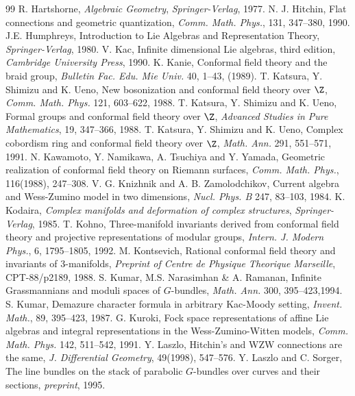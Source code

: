 \begin{thebibliography}{99}
 R. Hartshorne, \emph{Algebraic Geometry}, \emph{Springer-Verlag}, 1977.
 N. J. Hitchin, Flat connections and geometric quantization, \emph{Comm. Math. Phys.}, 131, 347--380, 1990.
 J.E. Humphreys, Introduction to Lie Algebras and Representation Theory, \emph{Springer-Verlag}, 1980.
 V. Kac, Infinite dimensional Lie algebras, third edition, \emph{Cambridge University Press}, 1990.
 K. Kanie, Conformal field theory and the braid group, \emph{Bulletin Fac. Edu. Mie Univ.} 40, 1--43, (1989).
 T. Katsura, Y. Shimizu and K. Ueno, New bosonization and conformal field theory over $\Z$, \emph{Comm. Math. Phys.} 121, 603--622, 1988.
 T. Katsura, Y. Shimizu and K. Ueno, Formal groups and conformal field theory over $\Z$, \emph{Advanced Studies in Pure Mathematics}, 19, 347--366, 1988.
 T. Katsura, Y. Shimizu and K. Ueno, Complex cobordism ring and conformal field theory over $\Z$, \emph{Math. Ann.} 291, 551--571, 1991.
 N. Kawamoto, Y. Namikawa, A. Tsuchiya and Y. Yamada, Geometric realization of conformal field theory on Riemann surfaces, \emph{Comm. Math. Phys.}, 116(1988), 247--308.
 V. G. Knizhnik and A. B. Zamolodchikov, Current algebra and Wess-Zumino model in two dimensions, \emph{Nucl. Phys. B} 247, 83--103, 1984.
 K. Kodaira, \emph{Complex manifolds and deformation of complex structures}, \emph{Springer-Verlag}, 1985.
 T. Kohno, Three-manifold invariants derived from conformal field theory and projective representations of modular groups, \emph{Intern. J. Modern Phys.}, 6, 1795--1805, 1992.
 M. Kontsevich, Rational conformal field theory and invariants of 3-manifolds, \emph{Preprint of Centre de Physique Theorique Marseille}, CPT-88/p2189, 1988.
 S. Kumar, M.S. Narasimhan \& A. Ramanan, Infinite Grassmannians and moduli spaces of $G$-bundles, \emph{Math. Ann.} 300, 395--423,1994.
 S. Kumar, Demazure character formula in arbitrary Kac-Moody setting, \emph{Invent. Math.}, 89, 395--423, 1987.
 G. Kuroki, Fock space representations of affine Lie algebras and integral representations in the Wess-Zumino-Witten models, \emph{Comm. Math. Phys.} 142, 511--542, 1991.
 Y. Laszlo, Hitchin's and WZW connections are the same, \emph{J. Differential Geometry}, 49(1998), 547--576.
 Y. Laszlo and C. Sorger, The line bundles on the stack of parabolic $G$-bundles over curves and their sections, \emph{preprint}, 1995.

\end{thebibliography}
